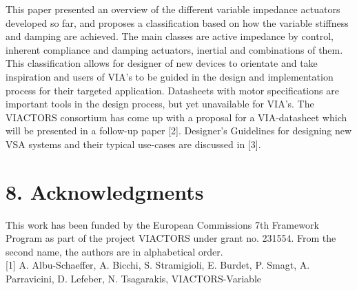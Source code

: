 \documentclass[10pt]{article}
\begin{document}
This paper presented an overview of the different variable impedance actuators developed so far, and proposes a classification based on how the variable stiffness and damping are achieved. The main classes are active impedance by control, inherent compliance and damping actuators, inertial and combinations of them. This classification allows for designer of new devices to orientate and take inspiration and users of VIA's to be guided in the design and implementation process for their targeted application. Datasheets with motor specifications are important tools in the design process, but yet unavailable for VIA's. The VIACTORS consortium has come up with a proposal for a VIA-datasheet which will be presented in a follow-up paper [2]. Designer's Guidelines for designing new VSA systems and their typical use-cases are discussed in [3].

\section*{8. Acknowledgments}
This work has been funded by the European Commissions 7th Framework Program as part of the project VIACTORS under grant no. 231554. From the second name, the authors are in alphabetical order.\\[0pt]
[1] A. Albu-Schaeffer, A. Bicchi, S. Stramigioli, E. Burdet, P. Smagt, A. Parravicini, D. Lefeber, N. Tsagarakis, VIACTORS-Variable
\end{document}
